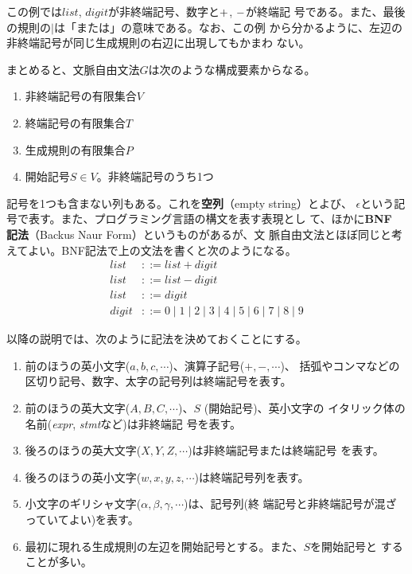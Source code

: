 この例では$list$, $digit$が非終端記号、数字と${\sf +}$, ${\sf -}$が終端記
号である。また、最後の規則の$\mid$は「または」の意味である。なお、この例
から分かるように、左辺の非終端記号が同じ生成規則の右辺に出現してもかまわ
ない。

まとめると、文脈自由文法$G$は次のような構成要素からなる。
\begin{enumerate}
 \item 非終端記号の有限集合$V$
 \item 終端記号の有限集合$T$
 \item 生成規則の有限集合$P$
 \item 開始記号$S \in V$。非終端記号のうち1つ
\end{enumerate}

記号を1つも含まない列もある。これを{\bfseries 空列}（empty string）とよび、
$\epsilon$という記号で表す。また、プログラミング言語の構文を表す表現とし
て、ほかに{\bfseries BNF 記法}（Backus Naur Form）というものがあるが、文
脈自由文法とほぼ同じと考えてよい。BNF記法で上の文法を書くと次のようになる。
\begin{align*}
 list & ::= list + digit \\
 list & ::= list - digit \\
 list & ::= digit \\
 digit & ::= 0 \mid 1 \mid 2 \mid 3 \mid 4 \mid 5 \mid 6 \mid 7 \mid 8
 \mid 9 
\end{align*}


以降の説明では、次のように記法を決めておくことにする。
\begin{enumerate}
 \item 前のほうの英小文字($a, b, c, \cdots$)、演算子記号($+, -, \cdots$)、
       括弧やコンマなどの区切り記号、数字、太字の記号列は終端記号を表す。
 \item 前のほうの英大文字($A, B, C, \cdots$)、$S$ (開始記号)、英小文字の
       イタリック体の名前({\itshape expr}, {\itshape stmt}など)は非終端記
       号を表す。
 \item 後ろのほうの英大文字($X, Y, Z, \cdots$)は非終端記号または終端記号
       を表す。
 \item 後ろのほうの英小文字($w, x, y, z, \cdots$)は終端記号列を表す。
 \item 小文字のギリシャ文字($\alpha, \beta, \gamma, \cdots$)は、記号列(終
       端記号と非終端記号が混ざっていてよい)を表す。
 \item 最初に現れる生成規則の左辺を開始記号とする。また、$S$を開始記号と
       することが多い。
\end{enumerate}

